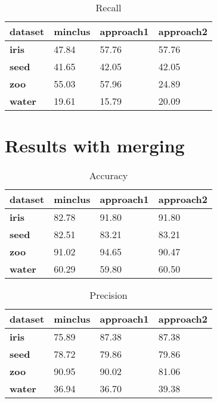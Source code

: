 \begin{table}[ht]
\caption{Recall} 
\begin{center}
		\begin{tabular}{ | l | l | l | l |}
				\hline

				\textbf{dataset} & \textbf{minclus} & \textbf{approach1} & \textbf{approach2} \\ \hline

				\textbf{iris} &  47.84 & 57.76 & 57.76 \\ \hline
				\textbf{seed} & 41.65 & 42.05 & 42.05 \\ \hline
				\textbf{zoo} & 55.03 & 57.96 & 24.89  \\ \hline
				\textbf{water} & 19.61 & 15.79 & 20.09 \\ \hline
		\end{tabular}
\end{center}
\label{table:rec}
\end{table}

\section{Results with merging}

\begin{table}[ht]
\caption{Accuracy} 
\begin{center}
		\begin{tabular}{ | l | l | l | l |}
				\hline

				\textbf{dataset} & \textbf{minclus} & \textbf{approach1} & \textbf{approach2} \\ \hline
                \textbf{iris} & 82.78 & 91.80 & 91.80 \\ \hline
                \textbf{seed} & 82.51 & 83.21 & 83.21 \\ \hline
                \textbf{zoo} & 91.02 & 94.65 & 90.47  \\ \hline
                \textbf{water} & 60.29 & 59.80 & 60.50  \\ \hline
		\end{tabular}
\end{center}
\label{table:acc}
\end{table}



\begin{table}[ht]
\caption{Precision} 
\begin{center}
		\begin{tabular}{ | l | l | l | l |}
				\hline

				\textbf{dataset} & \textbf{minclus} & \textbf{approach1} & \textbf{approach2} \\ \hline

				\textbf{iris} & 75.89 & 87.38 & 87.38 \\ \hline
				\textbf{seed} & 78.72 & 79.86 & 79.86 \\ \hline
				\textbf{zoo}  & 90.95 & 90.02 & 81.06 \\ \hline
				\textbf{water}& 36.94 & 36.70 & 39.38 \\ \hline
		\end{tabular}
\end{center}
\label{table:pre}
\end{table}

